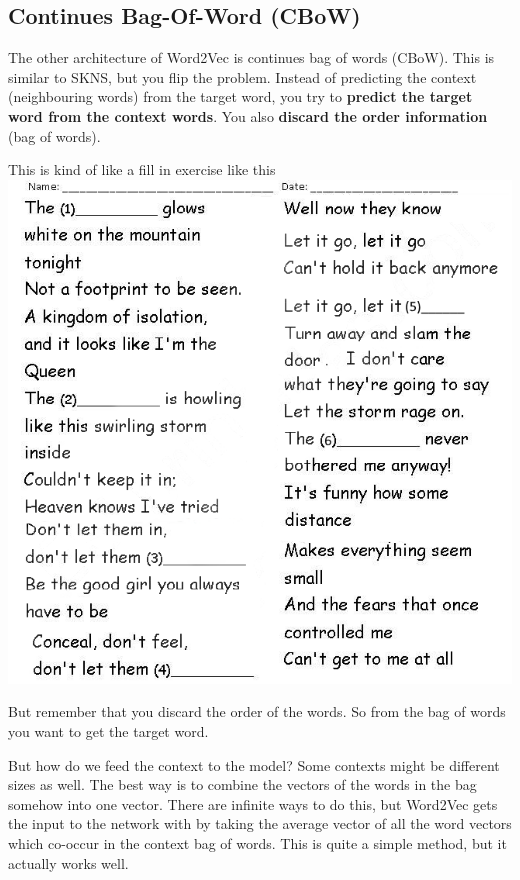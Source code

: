 \documentclass[
  11pt,
  british,
]{article}
\begin{document}
\hypertarget{continues-bag-of-word-cbow}{%
\subsection{Continues Bag-Of-Word
(CBoW)}\label{continues-bag-of-word-cbow}}

The other architecture of Word2Vec is continues bag of words (CBoW).
This is similar to SKNS, but you flip the problem. Instead of predicting
the context (neighbouring words) from the target word, you try to
\textbf{predict the target word from the context words}. You also
\textbf{discard the order information} (bag of words).

This is kind of like a fill in exercise like this
\includegraphics{fill-in-exercise.png}

But remember that you discard the order of the words. So from the bag of
words you want to get the target word.

But how do we feed the context to the model? Some contexts might be
different sizes as well. The best way is to combine the vectors of the
words in the bag somehow into one vector. There are infinite ways to do
this, but Word2Vec gets the input to the network with by taking the
average vector of all the word vectors which co-occur in the context bag
of words. This is quite a simple method, but it actually works well.
\end{document}
